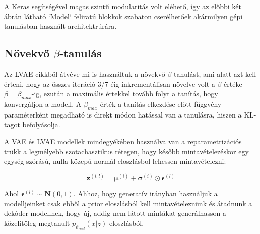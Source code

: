 \documentclass[12pt, english]{article}
\begin{document}
\vspace{4mm}

\par A Keras segítségével magas szintű modularitás volt eléhető, így az előbbi két ábrán látható `Model` feliratú blokkok szabaton cserélhetőek akármilyen gépi tanulásban használt architektrúrára. 

\vspace{5mm}

\subsection{Növekvő $\beta$-tanulás}

\vspace{5mm}

\par Az LVAE cikkből \cite{sonderby2016ladder} átvéve mi is használtuk a növekvő $\beta$ tanulást, ami alatt azt kell érteni, hogy az összes iteráció 3/7-éig inkrementálisan növelve volt a $\beta$ értéke $\beta = \beta_{max}$-ig, ezután a maximális értekkel tovább folyt a tanítás, hogy konvergáljon a modell. A $\beta_{max}$ érték a tanítás elkezdése előtt függvény paraméterként megadható is direkt módon hatással van a tanulásra, hiszen a KL-tagot befolyásolja.

\vspace{4mm}

\par A VAE és LVAE modellek mindegyékében használva van a reparametrizációs trükk a legmélyebb szotachasztikus rétegen, hogy később mintavételezéskor egy egység szórású, nulla közepú normál eloszlásbol lehessen mintavételezni:

\vspace{4mm}

\begin{equation}
    \boldsymbol{\bm{z}}^{(i, l)} = \boldsymbol{\mu}^{(i)} + \boldsymbol{\sigma}^{(i)} \odot \boldsymbol{\bm{\epsilon}}^{(l)}
\end{equation}

\vspace{4mm}

\par Ahol $\boldsymbol{\bm{\epsilon}}^{(l)} \sim \boldsymbol{N}(0, 1)$. Ahhoz, hogy generatív irányban használjuk a modelljeinket csak ebből a prior eloszlásból kell mintavételeznünk és átadnunk a dekóder modellnek, hogy új, addig nem látott mintákat generálhasson a közelítőleg megtanult $p_{\vartheta_{real}}(x | z)$ eloszlásból.
\end{document}
